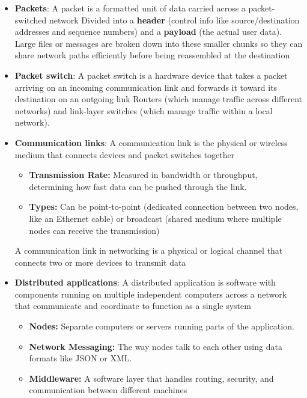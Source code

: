 \documentclass{report}
\begin{document}
    \begin{itemize}
        \item \textbf{Packets}: A packet is a formatted unit of data carried across a packet-switched network
            \bigbreak \noindent 
            Divided into a \textbf{header} (control info like source/destination addresses and sequence numbers) and a \textbf{payload} (the actual user data).
            \bigbreak \noindent 
            Large files or messages are broken down into these smaller chunks so they can share network paths efficiently before being reassembled at the destination
        \item \textbf{Packet switch}: A packet switch is a hardware device that takes a packet arriving on an incoming communication link and forwards it toward its destination on an outgoing link
            \bigbreak \noindent 
            Routers (which manage traffic across different networks) and link-layer switches (which manage traffic within a local network).
        \item \textbf{Communication links}: A communication link is the physical or wireless medium that connects devices and packet switches together
            \begin{itemize}
                \item \textbf{Transmission Rate:} Measured in bandwidth or throughput, determining how fast data can be pushed through the link.
                \item \textbf{Types:} Can be point-to-point (dedicated connection between two nodes, like an Ethernet cable) or broadcast (shared medium where multiple nodes can receive the transmission)
            \end{itemize}
            A communication link in networking is a physical or logical channel that connects two or more devices to transmit data
        \item \textbf{Distributed applications}: A distributed application is software with components running on multiple independent computers across a network that communicate and coordinate to function as a single system
            \begin{itemize}
                \item \textbf{Nodes:} Separate computers or servers running parts of the application.
                \item \textbf{Network Messaging:} The way nodes talk to each other using data formats like JSON or XML.
                \item \textbf{Middleware:} A software layer that handles routing, security, and communication between different machines

\end{itemize}
\end{itemize}
\end{document}
